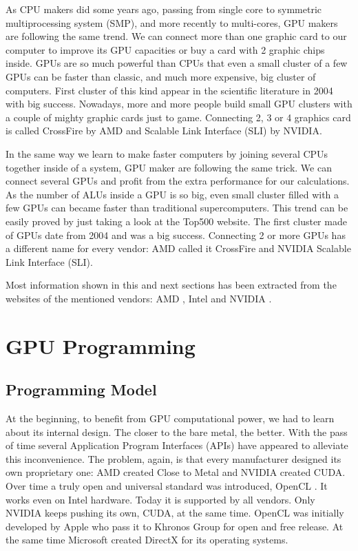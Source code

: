 \documentclass{article}
\begin{document}
As CPU makers did some years ago, passing from single core to symmetric multiprocessing system (SMP), and more recently to multi-cores, GPU makers are following the same trend. We can connect more than one graphic card to our computer to improve its GPU capacities or buy a card with 2 graphic chips inside. GPUs are so much powerful than CPUs that even a small cluster of a few GPUs can be faster than classic, and much more expensive, big cluster of computers. First cluster of this kind appear in the scientific literature in 2004 \cite{10.1109/SC.2004.26} with big success. Nowadays, more and more people build small GPU clusters with a couple of mighty graphic cards just to game. Connecting 2, 3 or 4 graphics card is called CrossFire by AMD and Scalable Link Interface (SLI) by NVIDIA.

In the same way we learn to make faster computers by joining several CPUs together inside of a system, GPU maker are following the same trick. We can connect several GPUs and profit from the extra performance for our calculations. As the number of ALUs inside a GPU is so big, even small cluster filled with a few GPUs can became faster than traditional supercomputers. This trend can be easily proved by just taking a look at the Top500 website. The first cluster made of GPUs date from 2004 \cite{10.1109/SC.2004.26} and was a big success. Connecting 2 or more GPUs has a different name for every vendor: AMD called it CrossFire and NVIDIA Scalable Link Interface (SLI).

Most information shown in this and next sections has been extracted from the websites of the mentioned vendors: AMD \cite{amd}, Intel \cite{intel} and NVIDIA \cite{nvidia}.

\section{GPU Programming}
\label{sec:programming}

\subsection{Programming Model}

At the beginning, to benefit from GPU computational power, we had to learn about its internal design. The closer to the bare metal, the better. With the pass of time several Application Program Interfaces (APIs) have appeared to alleviate this inconvenience. The problem, again, is that every manufacturer designed its own proprietary one: AMD created Close to Metal and NVIDIA created CUDA. Over time a truly open and universal standard was introduced, OpenCL \cite{opencl}. It works even on Intel hardware. Today it is supported by all vendors. Only NVIDIA keeps pushing its own, CUDA, at the same time. OpenCL was initially developed by Apple who pass it to Khronos Group for open and free release. At the same time Microsoft created DirectX for its operating systems.
\end{document}
